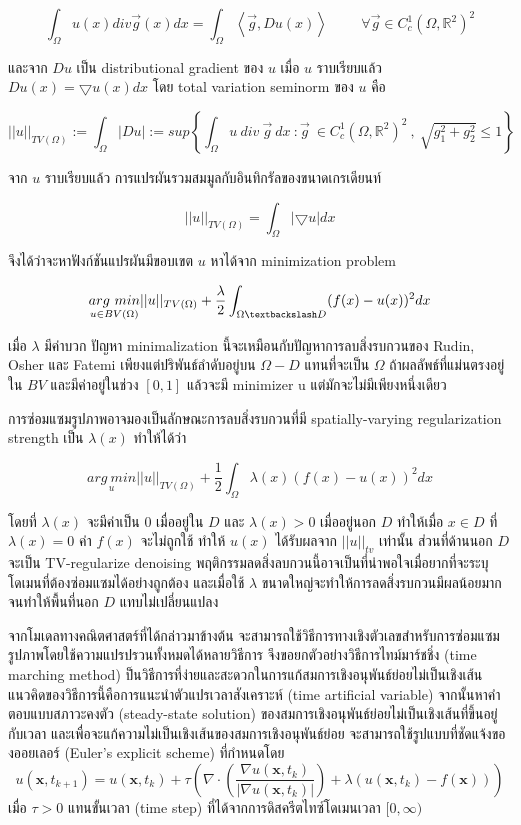 \documentclass[hidelinks,a4paper,14pt]{article}
\numberwithin{equation}{section}							%
\begin{document}
{		$$\int_{\Omega}u(x) div \vec{g}(x) dx = \int_{\Omega} \left\langle\vec{g},Du(x) \right\rangle\hspace{1cm}\forall\vec{g} \in C_c^1(\Omega,\mathbb{R}^2)^2$$
		
		และจาก $Du$ เป็น distributional gradient ของ $u$ เมื่อ $u$ ราบเรียบแล้ว  $Du(x)= \bigtriangledown u(x)dx $
		โดย total variation seminorm ของ $u$ คือ 
		
		$$ ||u||_{TV(\Omega)} := \int_{\Omega} | Du | := sup{ \left \{ \int_{\Omega}  u \ div  \ \vec{g} \ dx \  : \vec{g} \  \in C_c^1(\Omega,\mathbb{R}^2)^2 \ , \ \sqrt{g_1^2+g_2^2} \leq 1 \right \} }  $$
		
		จาก $u$ ราบเรียบแล้ว การแปรผันรวมสมมูลกับอินทิกรัลของขนาดเกรเดียนท์ 
		
		$$ ||u||_{TV(\Omega)} = \int_{\Omega} | \bigtriangledown u | dx$$
		
		จึงได้ว่าจะหาฟังก์ชันแปรผันมีขอบเขต $u$ หาได้จาก minimization problem
		
		$$ \underset{u \in BV(\Omega)}{arg \ min} ||u||_{TV(\Omega)} + \frac{\lambda}{2} \int_{\Omega \textbackslash D} (f(x) - u(x))^2 dx$$
		
		เมื่อ $\lambda$ มีค่าบวก ปัญหา minimalization นี้จะเหมือนกับปัญหาการลบสิ่งรบกวนของ Rudin, Osher และ Fatemi เพียงแต่ปริพันธ์ลำดับอยู่บน $\Omega-D$  แทนที่จะเป็น $\Omega$ ถ้าผลลัพธ์ที่แม่นตรงอยู่ใน $BV$ และมีค่าอยู่ในช่วง $[0,1]$ แล้วจะมี minimizer u แต่มักจะไม่มีเพียงหนึ่งเดียว 
		
		การซ่อมแซมรูปภาพอาจมองเป็นลักษณะการลบสิ่งรบกวนที่มี spatially-varying regularization strength เป็น $\lambda(x)$ ทำให้ได้ว่า
		
		$$\underset{u}{{arg \ min}} ||u||_{TV(\Omega)} + \frac{1}{2} \int_{\Omega} \lambda(x)(f(x) - u(x))^2 dx$$
		
		โดยที่ $\lambda(x)$ จะมีค่าเป็น $0$ เมื่ออยู่ใน $D$ และ $\lambda(x)>0$ เมื่ออยู่นอก $D$  ทำให้เมื่อ $x \in D$ ที่ $\lambda(x)=0$ ค่า $f(x)$ จะไม่ถูกใช้ ทำให้ $u(x)$ ได้รับผลจาก $||u||_{tv}$ เท่านั้น ส่วนที่ด้านนอก $D$ จะเป็น TV-regularize denoising พฤติกรรมลดสิ่งลบกวนนี้อาจเป็นที่น่าพอใจเมื่อยากที่จะระบุโดเมนที่ต้องซ่อมแซมได้อย่างถูกต้อง และเมื่อใช้ $λ$ ขนาดใหญ่จะทำให้การลดสิ่งรบกวนมีผลน้อยมากจนทำให้พื้นที่นอก $D$  แทบไม่เปลี่ยนแปลง
		
		จากโมเดลทางคณิตศาสตร์ที่ได้กล่าวมาข้างต้น จะสามารถใช้วิธีการทางเชิงตัวเลขสำหรับการซ่อมแซมรูปภาพโดยใช้ความแปรปรวนทั้งหมดได้หลายวิธีการ จึงขอยกตัวอย่างวิธีการไทม์มาร์ชชิ่ง (time marching method) \cite{ref:ExplicitTimeMarching}  ป็นวิธีการที่ง่ายและสะดวกในการแก้สมการเชิงอนุพันธ์ย่อยไม่เป็นเชิงเส้น
		แนวคิดของวิธีการนี้คือการแนะนําตัวแปรเวลาสังเคราะห์ (time artificial variable) จากนั้นหาคําตอบแบบสภาวะคงตัว (steady-state solution) ของสมการเชิงอนุพันธ์ย่อยไม่เป็นเชิงเส้นที่ขึ้นอยู่กับเวลา และเพื่อจะแก้ความไม่เป็นเชิงเส้นของสมการเชิงอนุพันธ์ย่อย จะสามารถใช้รูปแบบที่ชัดแจ้งของออยเลอร์ (Euler's explicit scheme) ที่กำหนดโดย
		$$
		u(\mathbf{x},t_{k+1})=u(\mathbf{x},t_{k})+\tau\left(\nabla\cdot\left(\frac{\nabla u ( \mathbf{x},t_k)}{\lvert \nabla u ( \mathbf{x},t_k) \rvert }\right) + \lambda(u ( \mathbf{x},t_k)-f(\mathbf{x})) \right)
		$$
		เมื่อ $\tau>0$ แทนขั้นเวลา (time step) ที่ได้จากการดิสครีตไทซ์โดเมนเวลา $[0,\infty)$
		
}
\end{document}
